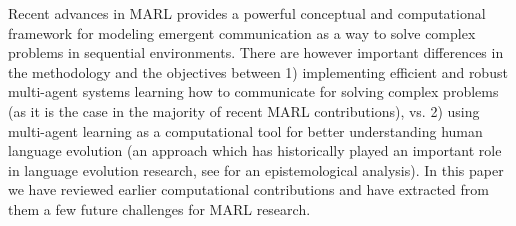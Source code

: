 \documentclass[letterpaper]{article} %
\begin{document}
Recent advances in MARL provides a powerful conceptual and computational framework for modeling emergent communication as a way to solve complex problems in sequential environments. There are however important differences in the methodology and the objectives between 1) implementing efficient and robust multi-agent systems learning how to communicate for solving complex problems (as it is the case in the majority of recent MARL contributions), vs. 2) using multi-agent learning as a computational tool for better understanding human language evolution (an approach which has historically played an important role in language evolution research, see \cite{oudeyer:hal-00818204} for an epistemological analysis). In this paper we have reviewed earlier computational contributions and have extracted from them a few future challenges for MARL research.

\fontsize{9.0pt}{10.0pt} \selectfont


\end{document}

